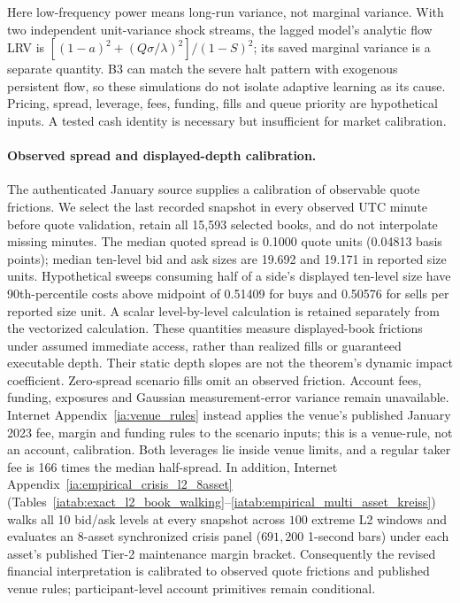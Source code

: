 \documentclass[12pt]{article}
\theoremstyle{definition}
\theoremstyle{remark}
\begin{document}
Here low-frequency power means long-run variance, not marginal variance. With two independent unit-variance shock streams, the lagged model's analytic flow LRV is $[(1-a)^2+(Q\sigma/\lambda)^2]/(1-S)^2$; its saved marginal variance is a separate quantity. B3 can match the severe halt pattern with exogenous persistent flow, so these simulations do not isolate adaptive learning as its cause. Pricing, spread, leverage, fees, funding, fills and queue priority are hypothetical inputs. A tested cash identity is necessary but insufficient for market calibration.

\paragraph{Observed spread and displayed-depth calibration.}
The authenticated January source supplies a calibration of observable quote frictions. We select the last recorded snapshot in every observed UTC minute before quote validation, retain all 15,593 selected books, and do not interpolate missing minutes. The median quoted spread is 0.1000 quote units (0.04813 basis points); median ten-level bid and ask sizes are 19.692 and 19.171 in reported size units. Hypothetical sweeps consuming half of a side's displayed ten-level size have 90th-percentile costs above midpoint of 0.51409 for buys and 0.50576 for sells per reported size unit. A scalar level-by-level calculation is retained separately from the vectorized calculation. These quantities measure displayed-book frictions under assumed immediate access, rather than realized fills or guaranteed executable depth. Their static depth slopes are not the theorem's dynamic impact coefficient. Zero-spread scenario fills omit an observed friction. Account fees, funding, exposures and Gaussian measurement-error variance remain unavailable. Internet Appendix~\ref{ia:venue_rules} instead applies the venue's published January 2023 fee, margin and funding rules to the scenario inputs; this is a venue-rule, not an account, calibration. Both leverages lie inside venue limits, and a regular taker fee is 166 times the median half-spread. In addition, Internet Appendix~\ref{ia:empirical_crisis_l2_8asset} (Tables~\ref{iatab:exact_l2_book_walking}--\ref{iatab:empirical_multi_asset_kreiss}) walks all 10 bid/ask levels at every snapshot across $100$ extreme L2 windows and evaluates an 8-asset synchronized crisis panel ($691{,}200$ 1-second bars) under each asset's published Tier-2 maintenance margin bracket. Consequently the revised financial interpretation is calibrated to observed quote frictions and published venue rules; participant-level account primitives remain conditional.
\end{document}
